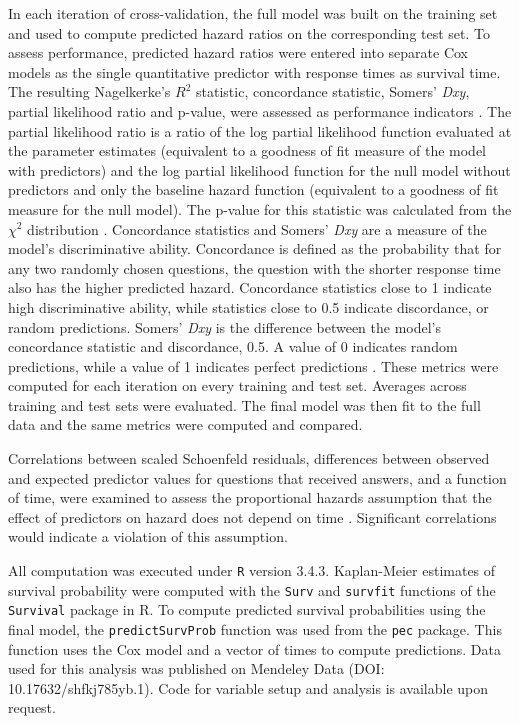 \documentclass[]{interact}\usepackage[]{graphicx}\usepackage[]{color}
\begin{document}
In each iteration of cross-validation, the full model was built on the training set and used to compute predicted hazard ratios on the corresponding test set. To assess performance, predicted hazard ratios were entered into separate Cox models as the single quantitative predictor with response times as survival time. The resulting Nagelkerke's $R^2$ statistic, concordance statistic, Somers' \textit{Dxy}, partial likelihood ratio and p-value, were assessed as performance indicators \cite{Chen}. The partial likelihood ratio is a ratio of the log partial likelihood function evaluated at the parameter estimates (equivalent to a goodness of fit measure of the model with predictors) and the log partial likelihood function for the null model without predictors and only the baseline hazard function (equivalent to a goodness of fit measure for the null model). The p-value for this statistic was calculated from the $\chi^2$ distribution \cite{Oakes1981}. Concordance statistics and Somers' \textit{Dxy} are a measure of the model's discriminative ability. Concordance is defined as the probability that for any two randomly chosen questions, the question with the shorter response time also has the higher predicted hazard. Concordance statistics close to 1 indicate high discriminative ability, while statistics close to 0.5 indicate discordance, or random predictions. Somers' \textit{Dxy} is the difference between the model's concordance statistic and discordance, 0.5. A value of 0 indicates random predictions, while a value of 1 indicates perfect predictions \cite{Harrell2015}. These metrics were computed for each iteration on every training and test set. Averages across training and test sets were evaluated. The final model was then fit to the full data and the same metrics were computed and compared. 

Correlations between scaled Schoenfeld residuals, differences between observed and expected predictor values for questions that received answers, and a function of time, were examined to assess the proportional hazards assumption that the effect of predictors on hazard does not depend on time \cite{Grambsch1994}. Significant correlations would indicate a violation of this assumption.

All computation was executed under \texttt{R} version 3.4.3.  Kaplan-Meier estimates of survival probability were computed with the \texttt{Surv} and \texttt{survfit} functions of the \texttt{Survival} package in R. To compute predicted survival probabilities using the final model, the \texttt{predictSurvProb} function was used from the \texttt{pec} package. This function uses the Cox model and a vector of times to compute predictions. Data used for this analysis was published on Mendeley Data (DOI: 10.17632/shfkj785yb.1). Code for variable setup and analysis is available upon request. 
\end{document}
